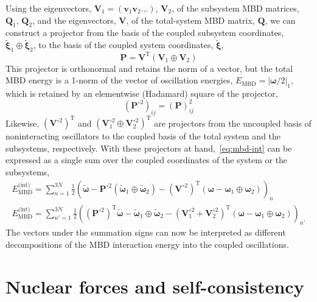 Using the eigenvectors, $\mathbf V_1=(\mathbf v_1\mathbf v_2\ldots)$, $\mathbf V_2$, of the subsystem MBD matrices, $\mathbf Q_1$, $\mathbf Q_2$, and the eigenvectors, $\mathbf V$, of the total-system MBD matrix, $\mathbf Q$, we can construct a projector from the basis of the coupled subsystem coordinates, $\tilde{\boldsymbol\xi}_1\oplus\tilde{\boldsymbol\xi}_2$, to the basis of the coupled system coordinates, $\tilde{\boldsymbol\xi}$,
\begin{equation}
  \mathbf P=\mathbf V^\mathrm T(\mathbf V_1\oplus\mathbf V_2)
\end{equation}
This projector is orthonormal and retains the norm of a vector, but the total MBD energy is a 1-norm of the vector of oscillation energies, $E_\text{MBD}=|\boldsymbol\omega/2|_1$, which is retained by an elementwise (Hadamard) square of the projector,
\begin{equation}
  (\mathbf P^{\circ2})_{ij}=(\mathbf P)_{ij}^2
\end{equation}
Likewise, $(\mathbf V^{\circ2})^\mathrm T$ and $(\mathbf V_1^{\circ2}\oplus\mathbf V_2^{\circ2})^\mathrm T$ are projectors from the uncoupled basis of noninteracting oscillators to the coupled basis of the total system and the subsystems, respectively.
With these projectors at hand,~\eqref{eq:mbd-int} can be expressed as a single sum over the coupled coordinates of the system or the subsystems,
\begin{gather}
	E_\text{MBD}^\text{(int)}=\sum_{n=1}^{3N}\tfrac12\left(\tilde{\boldsymbol\omega}-\mathbf P^{\circ2}(\tilde{\boldsymbol\omega}_1\oplus\tilde{\boldsymbol\omega}_2)-(\mathbf V^{\circ2})^\mathrm T({\boldsymbol\omega}-{\boldsymbol\omega}_1\oplus{\boldsymbol\omega_2})\right)_n \label{eq:decom-1}\\
	E_\text{MBD}^\text{(int)}=\sum_{n'=1}^{3N}\tfrac12\left((\mathbf P^{\circ2})^\mathrm T\tilde{\boldsymbol\omega}-\tilde{\boldsymbol\omega}_1\oplus\tilde{\boldsymbol\omega}_2-(\mathbf V_1^{\circ2}+\mathbf V_2^{\circ2})^\mathrm T({\boldsymbol\omega}-{\boldsymbol\omega}_1\oplus{\boldsymbol\omega_2})\right)_{n'}\label{eq:decom-2}
\end{gather}
The vectors under the summation signs can now be interpreted as different decompositions of the MBD interaction energy into the coupled oscillations.

\section{Nuclear forces and self-consistency}

